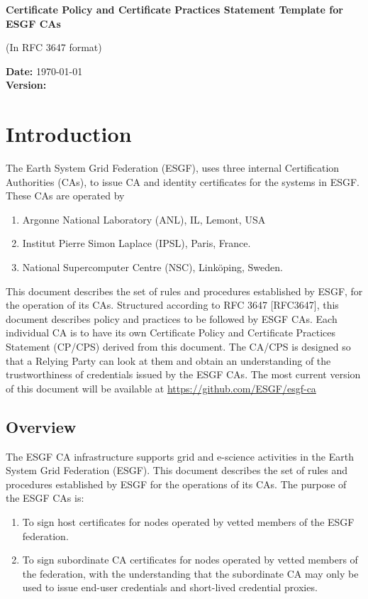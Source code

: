 \textbf{Certificate Policy and Certificate Practices Statement Template for ESGF CAs}

(In RFC 3647 format)

\textbf{Date:} \today\\
\textbf{Version:} \versionnum

\section{Introduction}\label{introduction}

The Earth System Grid Federation (ESGF), uses three internal Certification Authorities (CAs), to issue CA and identity certificates for the systems in ESGF.
These CAs are operated by
\begin{enumerate}
\item Argonne National Laboratory (ANL), IL, Lemont, USA
\item Institut Pierre Simon Laplace (IPSL), Paris, France.
\item National Supercomputer Centre (NSC), Link\"oping, Sweden.
\end{enumerate}
This document describes the set of rules and procedures established by ESGF, for the operation of its CAs. Structured according to RFC 3647
{[}RFC3647{]}, this document describes policy and practices to be followed by ESGF CAs. Each individual CA is to have its own Certificate Policy and Certificate Practices Statement (CP/CPS) derived from this document.
The CA/CPS is designed so that a Relying Party can look at them and obtain an understanding of the trustworthiness of credentials issued by the ESGF CAs. The most current version of this document will be available at \url{https://github.com/ESGF/esgf-ca}

\subsection{Overview}\label{overview}

The ESGF CA infrastructure supports grid and e-science activities in
the Earth System Grid Federation (ESGF). This document describes the
set of rules and procedures established by ESGF for the operations of its CAs. The purpose of the ESGF CAs is:

\begin{enumerate}
\item
  
  To sign host certificates for nodes operated by vetted members of the ESGF federation.
  
\item
  
  To sign subordinate CA certificates for nodes operated by vetted members of the federation, with the understanding that the subordinate CA may only be used to issue end-user credentials and short-lived credential proxies. 
  
\end{enumerate}

